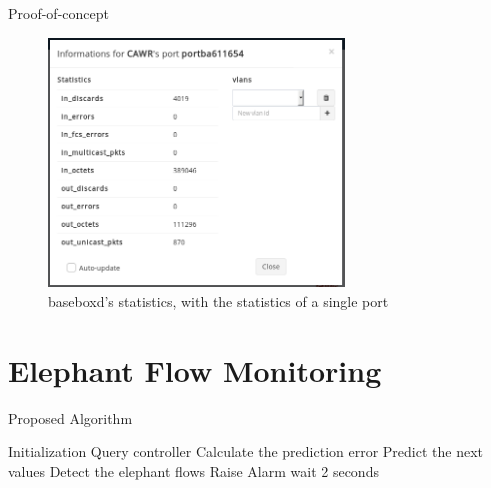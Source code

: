 \documentclass{beamer}
\begin{document}
\begin{frame}{Proof-of-concept}
    \begin{figure}[!tbph]
      \centering
      \includegraphics[width=0.7\textwidth]{bisdn/basebox_gui}
      \caption {baseboxd's statistics, with the statistics of a single port}
    \end{figure}
\end{frame}

\section{Elephant Flow Monitoring}

\begin{frame}{Proposed Algorithm}
    \begin{algorithm}[H]
        \caption{Elephant Detection Algorithm - High Level} \label{alg:high_level}
        \begin{algorithmic}[1]
                \State Initialization
                \pause
                \Loop
                    \State Query controller
                    \pause
                    \State Calculate the prediction error
                    \pause
                    \State Predict the next values
                    \pause
                    \State Detect the elephant flows
                        \State Raise Alarm
                    \EndIf
                    \State wait 2 seconds
                    \pause
                \EndLoop
            \EndProcedure 
           \end{algorithmic}
    \end{algorithm}
\end{frame}
\end{document}
